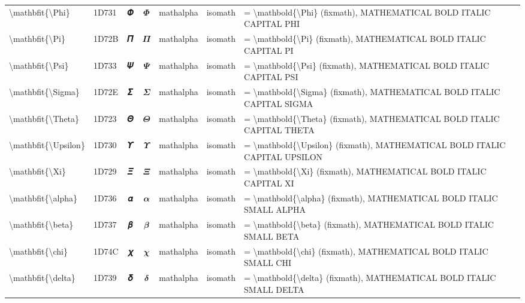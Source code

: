 \documentclass[a4paper,landscape]{article}
\begin{document}
\begin{longtable}{llcclll}
\textbackslash{}mathbfit\{\textbackslash{}Phi\} & 1D731 & 𝜱 & $\mathbfit{\Phi}$ & mathalpha & isomath & = \textbackslash{}mathbold\{\textbackslash{}Phi\} (fixmath), MATHEMATICAL BOLD ITALIC CAPITAL PHI \\
\textbackslash{}mathbfit\{\textbackslash{}Pi\} & 1D72B & 𝜫 & $\mathbfit{\Pi}$ & mathalpha & isomath & = \textbackslash{}mathbold\{\textbackslash{}Pi\} (fixmath), MATHEMATICAL BOLD ITALIC CAPITAL PI \\
\textbackslash{}mathbfit\{\textbackslash{}Psi\} & 1D733 & 𝜳 & $\mathbfit{\Psi}$ & mathalpha & isomath & = \textbackslash{}mathbold\{\textbackslash{}Psi\} (fixmath), MATHEMATICAL BOLD ITALIC CAPITAL PSI \\
\textbackslash{}mathbfit\{\textbackslash{}Sigma\} & 1D72E & 𝜮 & $\mathbfit{\Sigma}$ & mathalpha & isomath & = \textbackslash{}mathbold\{\textbackslash{}Sigma\} (fixmath), MATHEMATICAL BOLD ITALIC CAPITAL SIGMA \\
\textbackslash{}mathbfit\{\textbackslash{}Theta\} & 1D723 & 𝜣 & $\mathbfit{\Theta}$ & mathalpha & isomath & = \textbackslash{}mathbold\{\textbackslash{}Theta\} (fixmath), MATHEMATICAL BOLD ITALIC CAPITAL THETA \\
\textbackslash{}mathbfit\{\textbackslash{}Upsilon\} & 1D730 & 𝜰 & $\mathbfit{\Upsilon}$ & mathalpha & isomath & = \textbackslash{}mathbold\{\textbackslash{}Upsilon\} (fixmath), MATHEMATICAL BOLD ITALIC CAPITAL UPSILON \\
\textbackslash{}mathbfit\{\textbackslash{}Xi\} & 1D729 & 𝜩 & $\mathbfit{\Xi}$ & mathalpha & isomath & = \textbackslash{}mathbold\{\textbackslash{}Xi\} (fixmath), MATHEMATICAL BOLD ITALIC CAPITAL XI \\
\textbackslash{}mathbfit\{\textbackslash{}alpha\} & 1D736 & 𝜶 & $\mathbfit{\alpha}$ & mathalpha & isomath & = \textbackslash{}mathbold\{\textbackslash{}alpha\} (fixmath), MATHEMATICAL BOLD ITALIC SMALL ALPHA \\
\textbackslash{}mathbfit\{\textbackslash{}beta\} & 1D737 & 𝜷 & $\mathbfit{\beta}$ & mathalpha & isomath & = \textbackslash{}mathbold\{\textbackslash{}beta\} (fixmath), MATHEMATICAL BOLD ITALIC SMALL BETA \\
\textbackslash{}mathbfit\{\textbackslash{}chi\} & 1D74C & 𝝌 & $\mathbfit{\chi}$ & mathalpha & isomath & = \textbackslash{}mathbold\{\textbackslash{}chi\} (fixmath), MATHEMATICAL BOLD ITALIC SMALL CHI \\
\textbackslash{}mathbfit\{\textbackslash{}delta\} & 1D739 & 𝜹 & $\mathbfit{\delta}$ & mathalpha & isomath & = \textbackslash{}mathbold\{\textbackslash{}delta\} (fixmath), MATHEMATICAL BOLD ITALIC SMALL DELTA \\

\end{longtable}
\end{document}
